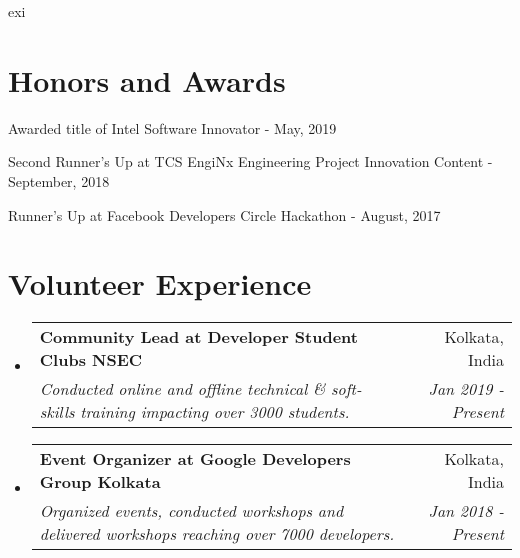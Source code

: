exi\documentclass[a4paper,20pt]{article}
\makeatletter
\newcommand{\resumeSubheading}[4]{
  \vspace{-1pt}\item
    \begin{tabular*}{0.97\textwidth}{l@{\extracolsep{\fill}}r}
      \textbf{#1} & #2 \\
      \textit{#3} & \textit{#4} \\
    \end{tabular*}\vspace{-5pt}
}
\newcommand{\resumeSubHeadingListStart}{\begin{itemize}[leftmargin=*]}
\newcommand{\resumeSubHeadingListEnd}{\end{itemize}}
\makeatother
\begin{document}
\section{Honors and Awards}
\begin{description}[font=$\bullet$]
\item {Awarded title of Intel Software Innovator - May, 2019}
\vspace{-5pt}
\item {Second Runner's Up at TCS EngiNx Engineering Project Innovation Content - September, 2018 }
\vspace{-5pt}
\item {Runner's Up at Facebook Developers Circle Hackathon - August, 2017}

\end{description}

\vspace{-5pt}
\section{Volunteer Experience}
  \resumeSubHeadingListStart
	\resumeSubheading
    {Community Lead at Developer Student Clubs NSEC}{Kolkata, India}
    {Conducted online and offline technical \& soft-skills training impacting over 3000 students.}{Jan 2019 - Present}
\vspace{5pt}
    \resumeSubheading
    {Event Organizer at Google Developers Group Kolkata}{Kolkata, India}
    {Organized events, conducted workshops and delivered workshops reaching over 7000 developers.}{Jan 2018 - Present}

\resumeSubHeadingListEnd
\end{document}
